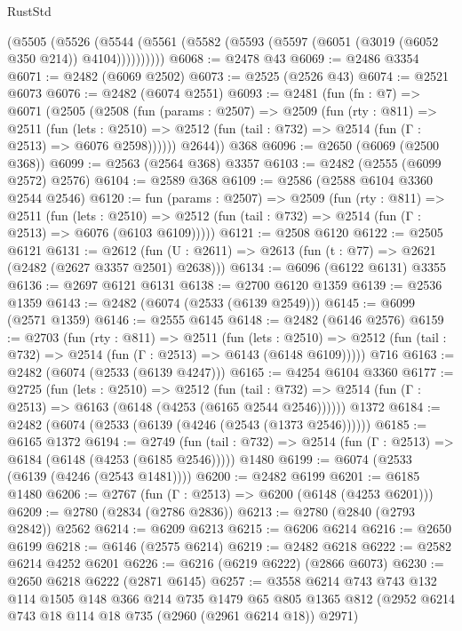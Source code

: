\begin{lexlean}{RustStd}
\begin{coremodule}
        (@5505
          (@5526 (@5544 (@5561 (@5582 (@5593 (@5597 (@6051 (@3019 (@6052 @350 @214)) @4104))))))))))
@6068 := @2478 @43
@6069 := @2486 @3354
@6071 := @2482 (@6069 @2502)
@6073 := @2525 (@2526 @43)
@6074 := @2521 @6073
@6076 := @2482 (@6074 @2551)
@6093 := @2481
    (fun (fn : @7) =>
    @6071
      (@2505
        (@2508
          (fun (params : @2507) =>
          @2509
            (fun (rty : @811) =>
            @2511
              (fun (lets : @2510) =>
              @2512 (fun (tail : @732) => @2514 (fun (Γ : @2513) => @6076 @2598))))))
        @2644))
    @368
@6096 := @2650 (@6069 (@2500 @368))
@6099 := @2563 (@2564 @368) @3357
@6103 := @2482 (@2555 (@6099 @2572) @2576)
@6104 := @2589 @368
@6109 := @2586 (@2588 @6104 @3360 @2544 @2546)
@6120 := fun (params : @2507) =>
  @2509
    (fun (rty : @811) =>
    @2511
      (fun (lets : @2510) =>
      @2512 (fun (tail : @732) => @2514 (fun (Γ : @2513) => @6076 (@6103 @6109)))))
@6121 := @2508 @6120
@6122 := @2505 @6121
@6131 := @2612 (fun (U : @2611) => @2613 (fun (t : @77) => @2621 (@2482 (@2627 @3357 @2501) @2638)))
@6134 := @6096 (@6122 @6131) @3355
@6136 := @2697 @6121 @6131
@6138 := @2700 @6120 @1359
@6139 := @2536 @1359
@6143 := @2482 (@6074 (@2533 (@6139 @2549)))
@6145 := @6099 (@2571 @1359)
@6146 := @2555 @6145
@6148 := @2482 (@6146 @2576)
@6159 := @2703
    (fun (rty : @811) =>
    @2511
      (fun (lets : @2510) =>
      @2512 (fun (tail : @732) => @2514 (fun (Γ : @2513) => @6143 (@6148 @6109)))))
    @716
@6163 := @2482 (@6074 (@2533 (@6139 @4247)))
@6165 := @4254 @6104 @3360
@6177 := @2725
    (fun (lets : @2510) =>
    @2512
      (fun (tail : @732) => @2514 (fun (Γ : @2513) => @6163 (@6148 (@4253 (@6165 @2544 @2546))))))
    @1372
@6184 := @2482 (@6074 (@2533 (@6139 (@4246 (@2543 (@1373 @2546))))))
@6185 := @6165 @1372
@6194 := @2749
    (fun (tail : @732) => @2514 (fun (Γ : @2513) => @6184 (@6148 (@4253 (@6185 @2546)))))
    @1480
@6199 := @6074 (@2533 (@6139 (@4246 (@2543 @1481))))
@6200 := @2482 @6199
@6201 := @6185 @1480
@6206 := @2767 (fun (Γ : @2513) => @6200 (@6148 (@4253 @6201)))
@6209 := @2780 (@2834 (@2786 @2836))
@6213 := @2780 (@2840 (@2793 @2842)) @2562
@6214 := @6209 @6213
@6215 := @6206 @6214
@6216 := @2650 @6199
@6218 := @6146 (@2575 @6214)
@6219 := @2482 @6218
@6222 := @2582 @6214 @4252 @6201
@6226 := @6216 (@6219 @6222) (@2866 @6073)
@6230 := @2650 @6218 @6222 (@2871 @6145)
@6257 := @3558
    @6214
    @743
    @743
    @132
    @114
    @1505
    @148
    @366
    @214
    @735
    @1479
    @65
    @805
    @1365
    @812
    (@2952 @6214 @743 @18 @114 @18 @735 (@2960 (@2961 @6214 @18)) @2971)

\end{coremodule}
\end{lexlean}
